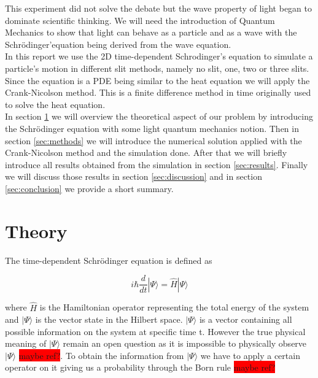 \documentclass[english,notitlepage,reprint,nofootinbib]{revtex4-2}  %
\begin{document}
	
	This experiment did not solve the debate but the wave property of light began to dominate 
	scientific thinking. We will need the introduction of Quantum Mechanics to show that 
	light can behave as a particle and as a wave with the Schrödinger'equation being derived 
	from the wave equation. \\
	
	In this report we use the 2D time-dependent Schrodinger's equation to simulate a particle's
	motion in different slit methods, namely no slit, one, two or three slits. Since the 
	equation is a PDE being similar to the heat equation we will apply the Crank-Nicolson method.
	This is a finite difference method in time originally used to solve the heat equation\cite{Crank1947APM}. \\
	
	In section \ref{sec:theory} we will overview the theoretical aspect of our problem by introducing
	the Schrödinger equation with some light quantum mechanics notion. Then in section \ref{sec:methods}
	we will introduce the numerical solution applied with the Crank-Nicolson method and the simulation
	done. After that we will briefly introduce all results obtained from the simulation in section 
	\ref{sec:results}. Finally we will discuss those results in section \ref{sec:discussion} and
	in section  \ref{sec:conclusion} we provide a short summary. 
	
	
	\section{Theory} \label{sec:theory}
	The time-dependent Schrödinger equation is defined as
	
	\begin{equation}
	i \hbar \frac{d}{d t}|\Psi\rangle=\hat{H}|\Psi\rangle \label{eq:schro_eq}
	\end{equation}
	
	where $\hat{H}$ is the Hamiltonian operator representing the total energy of the system
	and $|\Psi\rangle$ is the vector state in the Hilbert space. $|\Psi\rangle$ is a vector 
	containing all possible information on the system at specific time t. However the true 
	physical meaning of $|\Psi\rangle$ remain an open question as it is impossible to 
	physically observe $|\Psi\rangle$ \colorbox{red}{maybe ref?}. To obtain the information
	from $|\Psi\rangle$ we have to apply a certain operator on it giving us a probability 
	through the Born rule \colorbox{red}{maybe ref?} \\
\end{document}
